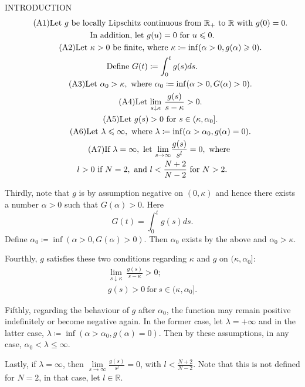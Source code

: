 {\color{red}INTRODUCTION}
\begin{gather}\tag{A1}\label{a1}\text{Let }g\text{ be locally Lipschitz continuous from }\mathbb{R}_+\text{ to }\mathbb{R}\text{ with }g(0)=0.\\
\notag\text{In addition, let }g(u)=0\text{ for }u\leq0.\\
%
\tag{A2}\label{a2}\text{Let }\kappa>0\text{ be finite, where }\kappa\coloneqq\inf(\alpha>0,g(\alpha)\geq0).\\ 
%
\notag\text{Define }G(t)\coloneqq\int_0^t g(s)ds.\\
%
\tag{A3}\label{a3}\text{Let }\alpha_0>\kappa,\text{ where }\alpha_0\coloneqq\inf(\alpha>0,G(\alpha)>0).\\
%
\tag{A4}\label{a4}\text{Let }\underset{s\downarrow\kappa}{\lim}~\frac{g(s)}{s-\kappa}>0.\\
%
\tag{A5}\label{a5}\text{Let }g(s)>0\text{ for }s\in(\kappa,\alpha_0].\\
%
\tag{A6}\label{a6}\text{Let }\lambda\leq\infty,\text{ where }\lambda\coloneqq\inf(\alpha>\alpha_0,g(\alpha)=0).\\
%
\tag{A7}\label{a7}\text{If }\lambda=\infty,\text{ let }\underset{s\to\infty}{\lim}\frac{g(s)}{s^l}=0,\text{ where }\\ \notag l>0\text{ if }N=2,\text{ and }l<\frac{N+2}{N-2}\text{ for }N>2.
\end{gather}
{\color{gray}
Thirdly, note that $g$ is by assumption negative on $(0,\kappa)$ and hence there exists a number $\alpha>0$ such that $G(\alpha)>0$. Here $$G(t)=\int_0^t g(s)ds.$$ Define $\alpha_0\coloneqq\inf(\alpha>0,G(\alpha)>0)$. Then $\alpha_0$ exists by the above and $\alpha_0>\kappa$. 

Fourthly, $g$ satisfies these two conditions regarding $\kappa$ and $g$ on $(\kappa,\alpha_0]$:
\begin{gather}
\label{6}\underset{s\downarrow\kappa}{\lim}~\frac{g(s)}{s-\kappa}>0;\\
g(s)>0~\text{for}~s\in(\kappa,\alpha_0].
\end{gather}

Fifthly, regarding the behaviour of $g$ after $\alpha_0$, the function may remain positive indefinitely or become negative again. In the former case, let $\lambda=+\infty$ and in the latter case, $\lambda\coloneqq\inf(\alpha>\alpha_0,g(\alpha)=0)$. Then by these assumptions, in any case, $\alpha_0<\lambda\leq\infty$. 

Lastly, if $\lambda=\infty$, then $\underset{s\to\infty}{\lim}\frac{g(s)}{s^l}=0$, with $l<\frac{N+2}{N-2}$. Note that this is not defined for $N=2$, in that case, let $l\in\mathbb{R}$.}

